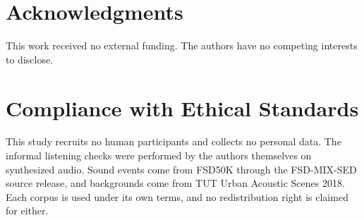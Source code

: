 \documentclass{article}
\begin{document}




\section*{Acknowledgments}
This work received no external funding. The authors have no competing interests
to disclose.

\section*{Compliance with Ethical Standards}
This study recruits no human participants and collects no personal data. The informal listening checks were performed by the authors themselves on synthesized audio. Sound events come from FSD50K through the FSD-MIX-SED source release, and backgrounds come from TUT Urban Acoustic Scenes 2018. Each corpus is used under its own terms, and no redistribution right is claimed for either.



\end{document}
